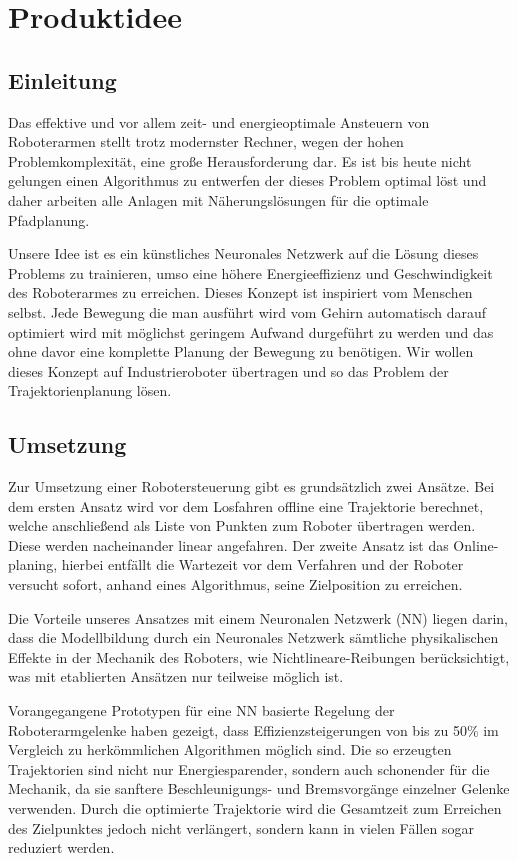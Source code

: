 \chapter{Produktidee}

\section{Einleitung}

Das effektive und vor allem zeit- und energieoptimale Ansteuern von Roboterarmen stellt trotz modernster Rechner, wegen der hohen Problemkomplexität, eine große Herausforderung dar. Es ist bis heute nicht gelungen einen Algorithmus zu entwerfen der dieses Problem optimal löst und daher arbeiten alle Anlagen mit Näherungslösungen für die optimale Pfadplanung.

Unsere Idee ist es ein künstliches Neuronales Netzwerk auf die Lösung dieses Problems zu trainieren, umso eine höhere Energieeffizienz und Geschwindigkeit des Roboterarmes zu erreichen.
Dieses Konzept ist inspiriert vom Menschen selbst. Jede Bewegung die man ausführt wird vom Gehirn automatisch darauf optimiert wird mit möglichst geringem Aufwand durgeführt zu werden und das ohne davor eine komplette Planung der Bewegung zu benötigen. Wir wollen dieses Konzept auf Industrieroboter übertragen und so das Problem der Trajektorienplanung lösen.

\section{Umsetzung}

Zur Umsetzung einer Robotersteuerung gibt es grundsätzlich zwei Ansätze. Bei dem ersten Ansatz wird vor dem Losfahren offline eine Trajektorie berechnet, welche anschließend als Liste von Punkten zum Roboter übertragen werden.  Diese werden nacheinander linear angefahren. Der zweite Ansatz ist das Online-planing, hierbei entfällt die Wartezeit vor dem Verfahren und der Roboter versucht sofort, anhand eines Algorithmus, seine Zielposition zu erreichen. 

Die Vorteile unseres Ansatzes mit einem Neuronalen Netzwerk (NN) liegen darin, dass die Modellbildung durch ein Neuronales Netzwerk sämtliche physikalischen Effekte in der Mechanik des Roboters, wie Nichtlineare-Reibungen berücksichtigt, was mit etablierten Ansätzen nur teilweise möglich ist.

Vorangegangene Prototypen für eine NN basierte Regelung der Roboterarmgelenke haben gezeigt, dass Effizienzsteigerungen von bis zu 50\% im Vergleich zu herkömmlichen Algorithmen möglich sind. Die so erzeugten Trajektorien sind nicht nur Energiesparender, sondern auch schonender für die Mechanik, da sie sanftere Beschleunigungs- und Bremsvorgänge einzelner Gelenke verwenden. Durch die optimierte Trajektorie wird die Gesamtzeit zum Erreichen des Zielpunktes jedoch nicht verlängert, sondern kann in vielen Fällen sogar reduziert werden.

